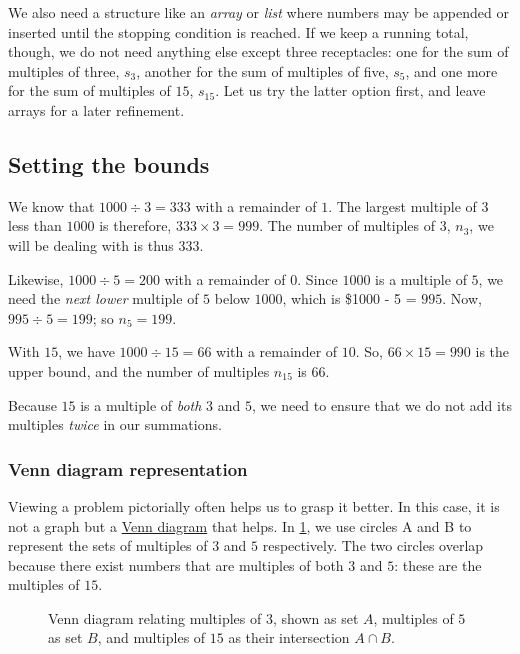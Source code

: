 \documentclass[
  a4paper,
]{article}
\begin{document}
We also need a structure like an \emph{array} or \emph{list} where
numbers may be appended or inserted until the stopping condition is
reached. If we keep a running total, though, we do not need anything
else except three receptacles: one for the sum of multiples of three,
\(s_3\), another for the sum of multiples of five, \(s_5\), and one more
for the sum of multiples of \(15\), \(s_{15}\). Let us try the latter
option first, and leave arrays for a later refinement.

\hypertarget{setting-the-bounds}{%
\subsection{Setting the bounds}\label{setting-the-bounds}}

We know that \(1000 \div 3 = 333\) with a remainder of \(1\). The
largest multiple of \(3\) less than \(1000\) is therefore,
\(333 \times 3 = 999\). The number of multiples of \(3\), \(n_{3}\), we
will be dealing with is thus \(333\).

Likewise, \(1000 \div 5 = 200\) with a remainder of \(0\). Since
\(1000\) is a multiple of \(5\), we need the \emph{next lower} multiple
of \(5\) below \(1000\), which is \$1000 - 5 = \(995\). Now,
\(995 \div 5 = 199\); so \(n_{5} = 199\).

With \(15\), we have \(1000 \div 15 = 66\) with a remainder of \(10\).
So, \(66 \times 15 = 990\) is the upper bound, and the number of
multiples \(n_{15}\) is \(66\).

Because \(15\) is a multiple of \emph{both} \(3\) and \(5\), we need to
ensure that we do not add its multiples \emph{twice} in our summations.

\hypertarget{venn-diagram-representation}{%
\subsubsection{Venn diagram
representation}\label{venn-diagram-representation}}

Viewing a problem pictorially often helps us to grasp it better. In this
case, it is not a graph but a
\href{https://www.lucidchart.com/pages/tutorial/venn-diagram}{Venn
diagram} that helps. In \cref{fig:venn}, we use circles A and B to
represent the sets of multiples of \(3\) and \(5\) respectively. The two
circles overlap because there exist numbers that are multiples of both
\(3\) and \(5\): these are the multiples of \(15\).

\begin{figure}
\hypertarget{fig:venn}{%
\centering

\caption{Venn diagram relating multiples of \(3\), shown as set \(A\),
multiples of \(5\) as set \(B\), and multiples of \(15\) as their
intersection \(A\cap B\).}\label{fig:venn}
}
\end{figure}
\end{document}
